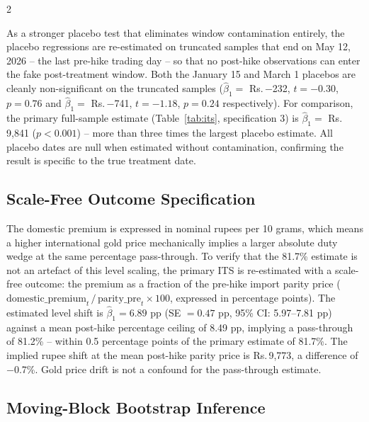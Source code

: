 \documentclass[12pt]{article}
\begin{document}
\begin{multicols}{2}

As a stronger placebo test that eliminates window contamination entirely, the placebo regressions are re-estimated on truncated samples that end on May 12, 2026 -- the last pre-hike trading day -- so that no post-hike observations can enter the fake post-treatment window. Both the January 15 and March 1 placebos are cleanly non-significant on the truncated samples ($\hat{\beta}_1 = $ Rs.\,$-$232, $t = -0.30$, $p = 0.76$ and $\hat{\beta}_1 = $ Rs.\,$-$741, $t = -1.18$, $p = 0.24$ respectively). For comparison, the primary full-sample estimate (Table~\ref{tab:its}, specification 3) is $\hat{\beta}_1 = $ Rs.\,9,841 ($p < 0.001$) -- more than three times the largest placebo estimate. All placebo dates are null when estimated without contamination, confirming the result is specific to the true treatment date.

\subsection*{Scale-Free Outcome Specification}

The domestic premium is expressed in nominal rupees per 10 grams, which means a higher international gold price mechanically implies a larger absolute duty wedge at the same percentage pass-through. To verify that the 81.7\% estimate is not an artefact of this level scaling, the primary ITS is re-estimated with a scale-free outcome: the premium as a fraction of the pre-hike import parity price ($\text{domestic\_premium}_t \,/\, \text{parity\_pre}_t \times 100$, expressed in percentage points). The estimated level shift is $\hat{\beta}_1 = 6.89$ pp (SE $= 0.47$ pp, 95\% CI: 5.97--7.81 pp) against a mean post-hike percentage ceiling of 8.49 pp, implying a pass-through of 81.2\% -- within 0.5 percentage points of the primary estimate of 81.7\%. The implied rupee shift at the mean post-hike parity price is Rs.\,9,773, a difference of $-$0.7\%. Gold price drift is not a confound for the pass-through estimate.

\subsection*{Moving-Block Bootstrap Inference}


\end{multicols}
\end{document}
